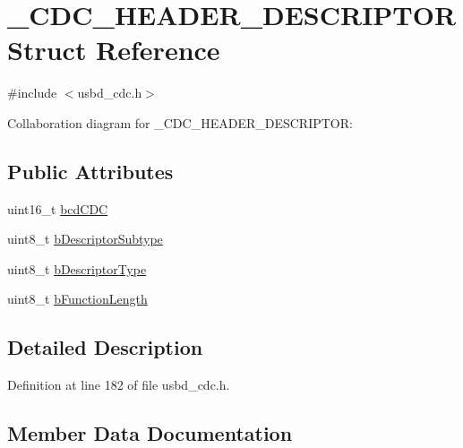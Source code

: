 \hypertarget{struct__CDC__HEADER__DESCRIPTOR}{}\section{\+\_\+\+C\+D\+C\+\_\+\+H\+E\+A\+D\+E\+R\+\_\+\+D\+E\+S\+C\+R\+I\+P\+T\+OR Struct Reference}
\label{struct__CDC__HEADER__DESCRIPTOR}


{\ttfamily \#include $<$usbd\+\_\+cdc.\+h$>$}



Collaboration diagram for \+\_\+\+C\+D\+C\+\_\+\+H\+E\+A\+D\+E\+R\+\_\+\+D\+E\+S\+C\+R\+I\+P\+T\+OR\+:
\subsection*{Public Attributes}
\begin{DoxyCompactItemize}
\item 
uint16\+\_\+t \hyperlink{struct__CDC__HEADER__DESCRIPTOR_a2650cd685ca91a2b3d3c046057287d46}{bcd\+C\+DC}
\item 
uint8\+\_\+t \hyperlink{struct__CDC__HEADER__DESCRIPTOR_a8023a40a5a8e7231ad509f2f1427e37b}{b\+Descriptor\+Subtype}
\item 
uint8\+\_\+t \hyperlink{struct__CDC__HEADER__DESCRIPTOR_acd21e37337cf4879585dfe4b13747b9c}{b\+Descriptor\+Type}
\item 
uint8\+\_\+t \hyperlink{struct__CDC__HEADER__DESCRIPTOR_a0b88951b1e043616876d35573a6d85ed}{b\+Function\+Length}
\end{DoxyCompactItemize}


\subsection{Detailed Description}


Definition at line 182 of file usbd\+\_\+cdc.\+h.



\subsection{Member Data Documentation}
